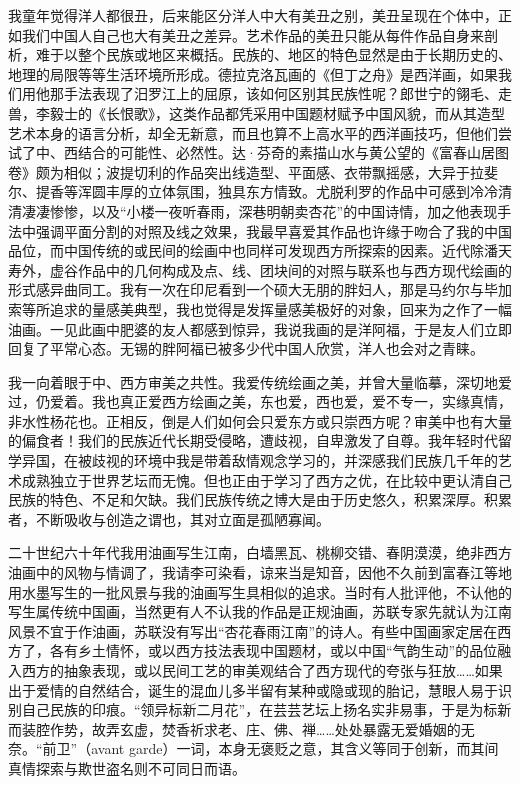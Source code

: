 \documentclass{article}
\begin{document}
我童年觉得洋人都很丑，后来能区分洋人中大有美丑之别，美丑呈现在个体中，正如我们中国人自己也大有美丑之差异。艺术作品的美丑只能从每件作品自身来剖析，难于以整个民族或地区来概括。民族的、地区的特色显然是由于长期历史的、地理的局限等等生活环境所形成。德拉克洛瓦画的《但丁之舟》是西洋画，如果我们用他那手法表现了汨罗江上的屈原，该如何区别其民族性呢？郎世宁的翎毛、走兽，李毅士的《长恨歌》，这类作品都凭采用中国题材赋予中国风貌，而从其造型艺术本身的语言分析，却全无新意，而且也算不上高水平的西洋画技巧，但他们尝试了中、西结合的可能性、必然性。达·芬奇的素描山水与黄公望的《富春山居图卷》颇为相似；波提切利的作品突出线造型、平面感、衣带飘摇感，大异于拉斐尔、提香等浑圆丰厚的立体氛围，独具东方情致。尤脱利罗的作品中可感到冷冷清清凄凄惨惨，以及“小楼一夜听春雨，深巷明朝卖杏花”的中国诗情，加之他表现手法中强调平面分割的对照及线之效果，我最早喜爱其作品也许缘于吻合了我的中国品位，而中国传统的或民间的绘画中也同样可发现西方所探索的因素。近代除潘天寿外，虚谷作品中的几何构成及点、线、团块间的对照与联系也与西方现代绘画的形式感异曲同工。我有一次在印尼看到一个硕大无朋的胖妇人，那是马约尔与毕加索等所追求的量感美典型，我也觉得是发挥量感美极好的对象，回来为之作了一幅油画。一见此画中肥婆的友人都感到惊异，我说我画的是洋阿福，于是友人们立即回复了平常心态。无锡的胖阿福已被多少代中国人欣赏，洋人也会对之青睐。

我一向着眼于中、西方审美之共性。我爱传统绘画之美，并曾大量临摹，深切地爱过，仍爱着。我也真正爱西方绘画之美，东也爱，西也爱，爱不专一，实缘真情，非水性杨花也。正相反，倒是人们如何会只爱东方或只崇西方呢？审美中也有大量的偏食者！我们的民族近代长期受侵略，遭歧视，自卑激发了自尊。我年轻时代留学异国，在被歧视的环境中我是带着敌情观念学习的，并深感我们民族几千年的艺术成熟独立于世界艺坛而无愧。但也正由于学习了西方之优，在比较中更认清自己民族的特色、不足和欠缺。我们民族传统之博大是由于历史悠久，积累深厚。积累者，不断吸收与创造之谓也，其对立面是孤陋寡闻。

二十世纪六十年代我用油画写生江南，白墙黑瓦、桃柳交错、春阴漠漠，绝非西方油画中的风物与情调了，我请李可染看，谅来当是知音，因他不久前到富春江等地用水墨写生的一批风景与我的油画写生具相似的追求。当时有人批评他，不认他的写生属传统中国画，当然更有人不认我的作品是正规油画，苏联专家先就认为江南风景不宜于作油画，苏联没有写出“杏花春雨江南”的诗人。有些中国画家定居在西方了，各有乡土情怀，或以西方技法表现中国题材，或以中国“气韵生动”的品位融入西方的抽象表现，或以民间工艺的审美观结合了西方现代的夸张与狂放……如果出于爱情的自然结合，诞生的混血儿多半留有某种或隐或现的胎记，慧眼人易于识别自己民族的印痕。“领异标新二月花”，在芸芸艺坛上扬名实非易事，于是为标新而装腔作势，故弄玄虚，焚香祈求老、庄、佛、禅……处处暴露无爱婚姻的无奈。“前卫”（avant garde）一词，本身无褒贬之意，其含义等同于创新，而其间真情探索与欺世盗名则不可同日而语。
\end{document}
